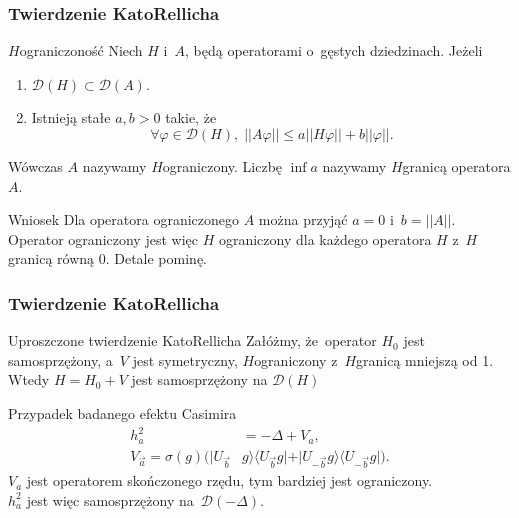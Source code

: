 \documentclass{beamer} \mode<presentation>
\newcommand{\mc}{\mathcal}
\newcommand{\Del}{\Delta}
\newcommand{\vp}{\varphi}
\newcommand{\si}{\sigma}
\newcommand{\D}{\mc{D}}
\newcommand{\sset}{\subset}
\newcommand{\lket}{\langle}
\newcommand{\rket}{\rangle}
\newcommand{\norm}[1]{\left|\left| #1 \right|\right|}
\newcommand{\veca}{\vec{ a }}
\newcommand{\vecb}{\vec{ b }}
\newcommand{\DA}{\D( A )}
\begin{document}
\begin{frame}
  \frametitle{Twierdzenie Kato\dywiz Rellicha}

  \begin{block}{$H$\dywiz ograniczoność}
    Niech $H$ i~$A$, będą operatorami o~gęstych dziedzinach. Jeżeli
    \begin{enumerate}
    \item $\D( H ) \sset \DA$.
    \item Istnieją stałe $a, b > 0$ takie, że
      \begin{equation}
        \label{eq:16}
        \forall \vp \in \D( H ), \; \norm{ A\vp } \leq a \norm{ H \vp }
        + b \norm{ \vp }.
      \end{equation}
    \end{enumerate}
    Wówczas $A$ nazywamy $H$\dywiz ograniczony. Liczbę $\inf a$
    nazywamy $H$\dywiz granicą operatora $A$.
  \end{block}

  \begin{block}{Wniosek} %
    Dla operatora ograniczonego $A$ można przyjąć $a = 0$
    i~$b = \norm{ A }$. Operator ograniczony jest więc $H$\dywiz
    ograniczony dla każdego operatora $H$ z~$H$\dywiz granicą równą 0.
    Detale pominę.
  \end{block}
  
\end{frame}




\begin{frame}
  \frametitle{Twierdzenie Kato\dywiz Rellicha}

  \begin{block}{Uproszczone twierdzenie Kato\dywiz Rellicha}
    Załóżmy, że~operator $H_{ 0 }$ jest samosprzężony, a~$V$ jest
    symetryczny, $H$\dywiz ograniczony z~$H$\dywiz granicą mniejszą od
    1. Wtedy $H = H_{ 0 } + V$ jest samosprzężony na $\D( H )$
  \end{block}

  \begin{block}{Przypadek badanego efektu Casimira}
    \begin{align}
      \label{eq:19}
      h_{ a }^{ 2 } &= -\Del + V_{ a }, \\
      V_{ \veca } = \si( g ) ( | U_{ \vecb } &g \rket \lket U_{ \vecb } g |
                                               + | U_{ -\vecb } g \rket \lket U_{ -\vecb } g | ).
    \end{align}
    $V_{ a }$ jest operatorem skończonego rzędu, tym bardziej jest
    ograniczony. \\
    $h_{ a }^{ 2 }$ jest więc samosprzężony na~$\D( -\Del )$.
  \end{block}
  
\end{frame}
\end{document}
